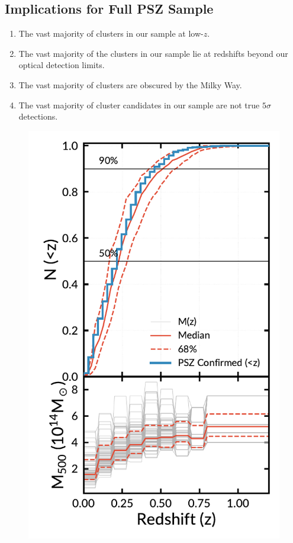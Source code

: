 \documentclass[apj, revtex4-1]{emulateapj}
\begin{document}
\subsection{Implications for Full PSZ Sample}
\begin{enumerate}
	\item The vast majority of clusters in our sample at low-$z$.
	\item The vast majority of the clusters in our sample lie at redshifts beyond our optical detection limits.
	\item The vast majority of clusters are obscured by the Milky Way.
	\item The vast majority of cluster candidates in our sample are not true $5\sigma$ detections.
\end{enumerate}

\begin{figure}
	\includegraphics[width=\columnwidth]{figures/cluster_forecast.pdf}

\end{figure}
\end{document}
